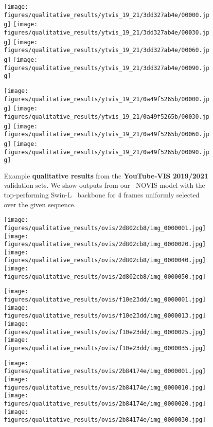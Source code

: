 \documentclass{article}
\newcommand{\method}{\mbox{NOVIS}}
\theoremstyle{plain}
\theoremstyle{definition}
\theoremstyle{remark}
\begin{document}
\begin{figure*}[t]
    \texttt{[image: figures/qualitative\_results/ytvis\_19\_21/3dd327ab4e/00000.jpg]}
    \texttt{[image: figures/qualitative\_results/ytvis\_19\_21/3dd327ab4e/00030.jpg]}
    \texttt{[image: figures/qualitative\_results/ytvis\_19\_21/3dd327ab4e/00060.jpg]}
    \texttt{[image: figures/qualitative\_results/ytvis\_19\_21/3dd327ab4e/00090.jpg]}

    \texttt{[image: figures/qualitative\_results/ytvis\_19\_21/0a49f5265b/00000.jpg]}
    \texttt{[image: figures/qualitative\_results/ytvis\_19\_21/0a49f5265b/00030.jpg]}
    \texttt{[image: figures/qualitative\_results/ytvis\_19\_21/0a49f5265b/00060.jpg]}
    \texttt{[image: figures/qualitative\_results/ytvis\_19\_21/0a49f5265b/00090.jpg]}

    
    \caption{
Example \textbf{qualitative results} from the \textbf{YouTube-VIS 2019/2021} validation sets.
We show outputs from our ~\method{} model with the top-performing Swin-L~\cite{SwinTransformer} backbone for 4 frames uniformly selected over the given sequence.
}
    \label{fig:qualitative_results_ytvis_19_21}
\end{figure*} \begin{figure*}[t]
    \centering
    \texttt{[image: figures/qualitative\_results/ovis/2d802cb8/img\_0000001.jpg]}
    \texttt{[image: figures/qualitative\_results/ovis/2d802cb8/img\_0000020.jpg]}
    \texttt{[image: figures/qualitative\_results/ovis/2d802cb8/img\_0000040.jpg]}
    \texttt{[image: figures/qualitative\_results/ovis/2d802cb8/img\_0000050.jpg]}

    \texttt{[image: figures/qualitative\_results/ovis/f10e23dd/img\_0000001.jpg]}
    \texttt{[image: figures/qualitative\_results/ovis/f10e23dd/img\_0000013.jpg]}
    \texttt{[image: figures/qualitative\_results/ovis/f10e23dd/img\_0000025.jpg]}
    \texttt{[image: figures/qualitative\_results/ovis/f10e23dd/img\_0000035.jpg]}

    \texttt{[image: figures/qualitative\_results/ovis/2b84174e/img\_0000001.jpg]}
    \texttt{[image: figures/qualitative\_results/ovis/2b84174e/img\_0000010.jpg]}
    \texttt{[image: figures/qualitative\_results/ovis/2b84174e/img\_0000020.jpg]}
    \texttt{[image: figures/qualitative\_results/ovis/2b84174e/img\_0000030.jpg]}


\end{figure*}
\end{document}
